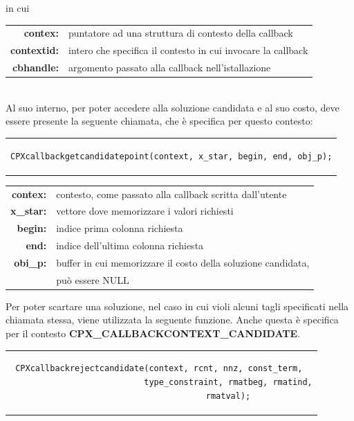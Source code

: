 in cui
\begin{table}[h]
\centering
\begin{tabular}{rl}
\textbf{contex:} & {puntatore ad una struttura di contesto della callback}\\
\textbf{contextid:} & {intero che specifica il contesto in cui invocare la callback}\\
\textbf{cbhandle:} & {argomento passato alla callback nell'istallazione}\\
\end{tabular}
\end{table}
\\Al suo interno, per poter accedere alla soluzione candidata e al suo costo, deve essere presente la seguente chiamata, che è specifica per questo contesto:
\begin{center}
\begin{tabular}{c}
\begin{lstlisting}[linewidth=385pt, basicstyle=\footnotesize\sffamily,]    
CPXcallbackgetcandidatepoint(context, x_star, begin, end, obj_p);
\end{lstlisting}
\end{tabular}
\end{center}
\vspace{2cm}
\begin{table}[h]
\centering
\begin{tabular}{rl}
\textbf{contex:} & {contesto, come passato alla callback scritta dall'utente}\\
\textbf{x\_star:} & {vettore dove memorizzare i valori richiesti}\\
\textbf{begin:} & {indice prima colonna richiesta}\\
\textbf{end:} & {indice dell'ultima colonna richiesta}\\
\textbf{obi\_p:} & {buffer in cui memorizzare il costo della soluzione candidata,}\\
&{può essere NULL}\\
\end{tabular}
\end{table}
Per poter scartare una soluzione, nel caso in cui violi alcuni tagli specificati nella chiamata stessa, viene utilizzata la seguente funzione. Anche questa è specifica per il contesto \textbf{CPX\_CALLBACKCONTEXT\_CANDIDATE}.
\begin{center}
\begin{tabular}{c}
\begin{lstlisting}[linewidth=365pt, basicstyle=\footnotesize\sffamily,]    
CPXcallbackrejectcandidate(context, rcnt, nnz, const_term, 
                           type_constraint, rmatbeg, rmatind,
                           rmatval);
\end{lstlisting}
\end{tabular}
\end{center}
